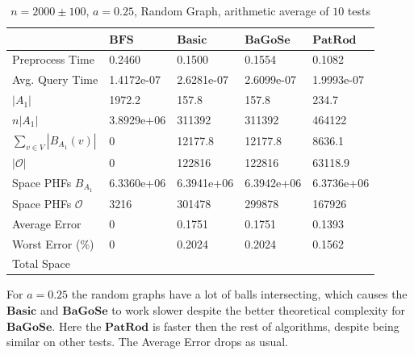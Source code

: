 \documentclass[shortabstract, lic, english]{iithesis}
\theoremstyle{definition} \newtheorem{definition}{Definition}[chapter]
\theoremstyle{plain} \newtheorem{remark}[definition]{Observation}
\theoremstyle{plain} \newtheorem{theorem}[definition]{Theorem}
\theoremstyle{plain} \newtheorem{lemma}[definition]{Lemma}
\theoremstyle{plain} \newtheorem{conjecture}[definition]{Conjecture}
\begin{document}
\begin{table}[H] \label{test:random.a0.25}
    \centering
    \begin{tabular}{ |p{3cm}||p{2cm}|p{2cm}|p{2cm}|p{2cm}|  } 
        \hline
        & $\mathbf{BFS}$ & $\mathbf{Basic}$ & $\mathbf{BaGoSe}$ & $\mathbf{PatRod}$ \\
        \hline
        \hline
        Preprocess Time                 & 0.2460     & 0.1500     & 0.1554      & 0.1082     \\
        \hline
        Avg. Query Time                 & 1.4172e-07 & 2.6281e-07 & 2.6099e-07  & 1.9993e-07 \\
        \hline
        $|A_1|$                         & 1972.2     & 157.8      & 157.8       & 234.7      \\
        \hline
        $n |A_1|$                       & 3.8929e+06 & 311392     & 311392      & 464122     \\
        \hline
        $\sum_{v \in V} |B_{A_1}(v)| $  & 0          & 12177.8    & 12177.8     & 8636.1     \\
        \hline
        $|\mathcal{O}|$                 & 0          & 122816     & 122816      & 63118.9    \\
        \hline
        Space PHFs $B_{A_1}$            & 6.3360e+06 & 6.3941e+06 & 6.3942e+06  & 6.3736e+06 \\
        \hline
        Space PHFs $\mathcal{O}$        & 3216       & 301478     & 299878      & 167926     \\
        \hline
        Average Error                   & 0          & 0.1751     & 0.1751      & 0.1393     \\
        \hline
        Worst Error (\%)                & 0          & 0.2024     & 0.2024      & 0.1562     \\
        \hline
        Total Space                     &            &            &             &            \\
        \hline

    \end{tabular}
    \caption{$n = 2000 \pm 100$, $a = 0.25$, Random Graph, arithmetic average of $10$ tests}
\end{table}

For $a = 0.25$ the random graphs have a lot of balls intersecting, which causes the $\mathbf{Basic}$ and $\mathbf{BaGoSe}$
to work slower despite the better theoretical complexity for $\mathbf{BaGoSe}$.
Here the $\mathbf{PatRod}$ is faster then the rest of algorithms, despite being similar on other tests.
The Average Error drops as usual.
\end{document}
